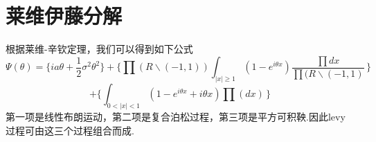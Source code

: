 \documentclass{ctexart} %
\begin{document}
\section{莱维伊藤分解}

根据莱维-辛钦定理，我们可以得到如下公式\[\Psi(\theta)=\{ia\theta+\frac{1}{2}\sigma^{2}\theta^{2}\}+\{\prod(R\backslash(-1,1))\int_{|x|\geq1}(1-e^{i\theta x})\frac{\prod{dx}}{\prod(R\backslash(-1,1)} \,\}\]\newline\[+\{\int_{0<|x|<1}(1-e^{i\theta x}+i\theta x)\prod(dx) \,\} \]
第一项是线性布朗运动，第二项是复合泊松过程，第三项是平方可积鞅.因此levy过程可由这三个过程组合而成.
\end{document}

